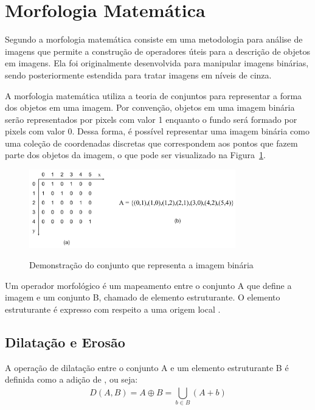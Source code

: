 \documentclass[12pt,oneside,a4paper,english,french,spanish,brazil,]{abntex2}
\begin{document}
\section{Morfologia Matemática}

Segundo \citet{pedrini:2008} a morfologia matemática consiste em uma metodologia para análise de imagens que permite a construção de operadores úteis para a descrição de objetos em imagens. Ela foi originalmente desenvolvida para manipular imagens binárias, sendo posteriormente estendida para tratar imagens em níveis de cinza.

A morfologia matemática utiliza a teoria de conjuntos para representar a forma dos objetos em uma imagem. Por convenção, objetos em uma imagem binária serão representados por pixels com valor 1 enquanto o fundo será formado por pixels com valor 0. Dessa forma, é possível representar uma imagem binária como uma coleção de coordenadas discretas que correspondem aos pontos que fazem parte dos objetos da imagem, o que pode ser visualizado na Figura~\ref{fig:PDI_Conjunto}.

\begin{figure}[ht]
\centering
\caption{Demonstração do conjunto que representa a imagem binária}
\includegraphics[width=0.8\textwidth]{imagens/PDI_Conjunto.pdf}
\label{fig:PDI_Conjunto}
\end{figure}

Um operador morfológico é um mapeamento entre o conjunto A que define a imagem e um conjunto B, chamado de elemento estruturante. O elemento estruturante é expresso com respeito a uma origem local \cite{pedrini:2008}.

\subsection{Dilatação e Erosão}

A operação de dilatação entre o conjunto A e um elemento estruturante B é definida como a adição de \citet{minkowski:1911}, ou seja: \[D(A,B)=A\oplus B=\bigcup_{b\in B}^{ } (A+b)\]
\end{document}

